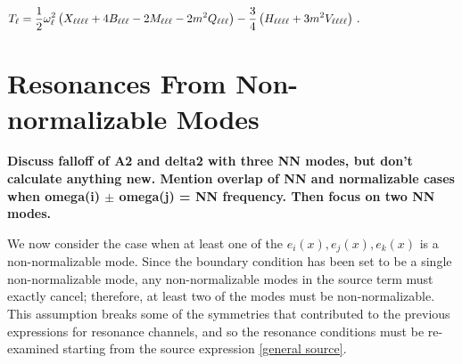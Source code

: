\documentclass[letterpaper,11pt]{article}
\newcommand{\ol}{\omega_\ell}
\begin{document}
\begin{align}
T_{\ell} &= \frac{1}{2} \ol^2 \left( X_{\ell \ell \ell \ell} + 4 B_{\ell \ell \ell} -2 M_{\ell \ell \ell} - 2m^2 Q_{\ell \ell \ell} \right) -\frac{3}{4} \left( H_{\ell \ell \ell \ell} + 3m^2 V_{\ell \ell \ell \ell} \right) \, . \hspace{1.0in}
\end{align}


\section{Resonances From Non-normalizable Modes}

{\bf Discuss falloff of A2 and delta2 with three NN modes, but don't calculate anything new. Mention overlap of NN and normalizable cases when omega(i) $\pm$ omega(j) = NN frequency. Then focus on two NN modes.}

We now consider the case when at least one of the $e_i(x), e_j(x), e_k(x)$ is a non-normalizable mode. Since the boundary condition has been set to be a single non-normalizable mode, any non-normalizable modes in the source term must exactly cancel; therefore, at least two of the modes must be non-normalizable. This assumption breaks some of the symmetries that contributed to the previous expressions for resonance channels, and so the resonance conditions must be re-examined starting from the source expression \eqref{general source}.
\end{document}
